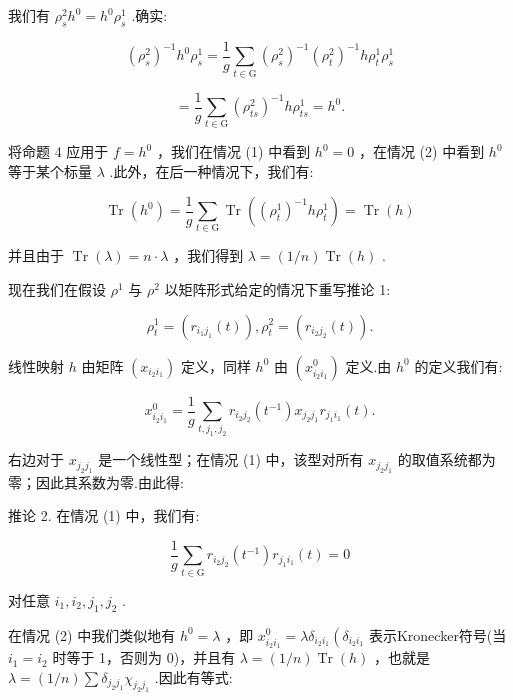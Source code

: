 我们有 \({\rho }_{s}^{2}{h}^{0} = {h}^{0}{\rho }_{s}^{1}\) .确实:

\[
{\left( {\rho }_{s}^{2}\right) }^{-1}{h}^{0}{\rho }_{s}^{1} = \frac{1}{g}\mathop{\sum }\limits_{{t \in  \mathrm{G}}}{\left( {\rho }_{s}^{2}\right) }^{-1}{\left( {\rho }_{t}^{2}\right) }^{-1}h{\rho }_{t}^{1}{\rho }_{s}^{1}
\]

\[
= \frac{1}{g}\mathop{\sum }\limits_{{t \in  \mathrm{G}}}{\left( {\rho }_{ts}^{2}\right) }^{-1}h{\rho }_{ts}^{1} = {h}^{0}.
\]

将命题 4 应用于 \(f = {h}^{0}\) ，我们在情况 (1) 中看到 \({h}^{0} = 0\) ，在情况 (2) 中看到 \({h}^{0}\) 等于某个标量 \(\lambda\) .此外，在后一种情况下，我们有:

\[
\operatorname{Tr}\left( {h}^{0}\right)  = \frac{1}{g}\mathop{\sum }\limits_{{t \in  \mathrm{G}}}\operatorname{Tr}\left( {{\left( {\rho }_{t}^{1}\right) }^{-1}h{\rho }_{t}^{1}}\right)  = \operatorname{Tr}\left( h\right)
\]

并且由于 \(\operatorname{Tr}\left( \lambda \right)  = n \cdot  \lambda\) ，我们得到 \(\lambda  = \left( {1/n}\right) \operatorname{Tr}\left( h\right)\) .

现在我们在假设 \({\rho }^{1}\) 与 \({\rho }^{2}\) 以矩阵形式给定的情况下重写推论 1:

\[
{\rho }_{t}^{1} = \left( {{r}_{{i}_{1}{j}_{1}}\left( t\right) }\right) ,{\rho }_{t}^{2} = \left( {{r}_{{i}_{2}{j}_{2}}\left( t\right) }\right) .
\]

线性映射 \(h\) 由矩阵 \(\left( {x}_{{i}_{2}{i}_{1}}\right)\) 定义，同样 \({h}^{0}\) 由 \(\left( {x}_{{i}_{2}{i}_{1}}^{0}\right)\) 定义.由 \({h}^{0}\) 的定义我们有:

\[
{x}_{{i}_{2}{i}_{1}}^{0} = \frac{1}{g}\mathop{\sum }\limits_{{t,{j}_{1},{j}_{2}}}{r}_{{i}_{2}{j}_{2}}\left( {t}^{-1}\right) {x}_{{j}_{2}{j}_{1}}{r}_{{j}_{1}{i}_{1}}\left( t\right) .
\]

右边对于 \({x}_{{j}_{2}{j}_{1}}\) 是一个线性型；在情况 (1) 中，该型对所有 \({x}_{{j}_{2}{j}_{1}}\) 的取值系统都为零；因此其系数为零.由此得:

推论 2. 在情况 (1) 中，我们有:

\[
\frac{1}{g}\mathop{\sum }\limits_{{t \in  \mathrm{G}}}{r}_{{i}_{2}{j}_{2}}\left( {t}^{-1}\right) {r}_{{j}_{1}{i}_{1}}\left( t\right)  = 0
\]

对任意 \({i}_{1},{i}_{2},{j}_{1},{j}_{2}\) .

在情况 (2) 中我们类似地有 \({h}^{0} = \lambda\) ，即 \({x}_{{i}_{2}{i}_{1}}^{0} = \lambda {\delta }_{{i}_{2}{i}_{1}}\left( {\delta }_{{i}_{2}{i}_{1}}\right.\) 表示Kronecker符号(当 \({i}_{1} = {i}_{2}\) 时等于 1，否则为 0)，并且有 \(\lambda  = \left( {1/n}\right) \operatorname{Tr}\left( h\right)\) ，也就是 \(\lambda  = \left( {1/n}\right) \sum {\delta }_{{j}_{2}{j}_{1}}{\chi }_{{j}_{2}{j}_{1}}\) .因此有等式:

